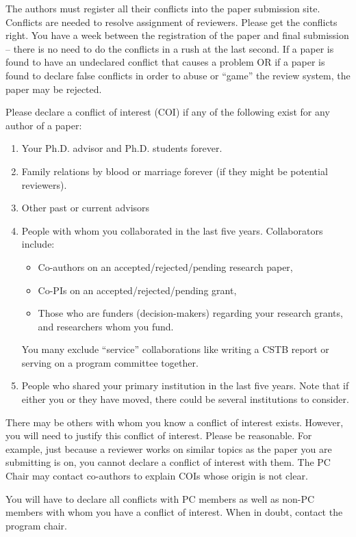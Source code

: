 The authors must register all their conflicts into the paper submission site.
Conflicts are needed to resolve assignment of reviewers. 
Please get the conflicts
right.  You have a week between the registration of the paper and final
submission -- there is no need to do the conflicts in a rush at the last
second. If a paper is found to
have an undeclared conflict that causes a problem OR if a paper is found to declare false conflicts in order to abuse or ``game'' the review system, the paper may be rejected.

Please declare a conflict of interest (COI) if any of the following exist for any author of a paper:

\begin{enumerate}
\item Your Ph.D. advisor and Ph.D. students forever.
\item Family relations by blood or marriage forever (if they might be potential reviewers).
\item Other past or current advisors
\item People with whom you collaborated in the last five years. Collaborators include:
\begin{itemize}
\item Co-authors on an accepted/rejected/pending research paper, 
\item Co-PIs on an accepted/rejected/pending grant, 
\item Those who are funders (decision-makers) regarding your research grants, and researchers whom you fund. 
\end{itemize}
You many exclude ``service'' collaborations like writing a CSTB report or serving on a program committee together.
\item People who shared your primary institution in the last five years. Note that if either you or they have moved, there could be several institutions to consider.
\end{enumerate}


There may be others with whom you know a conflict of interest exists.  However,
you will need to justify this conflict of interest.  Please be reasonable.  For
example, just because a reviewer works on similar topics as the paper you are
submitting is on, you cannot declare a conflict of interest with them. The PC Chair may contact co-authors to explain COIs whose origin is not clear.

You will have to declare all conflicts with PC members as well as non-PC members 
with whom you
have a conflict of interest.  When in doubt, contact the program chair.


